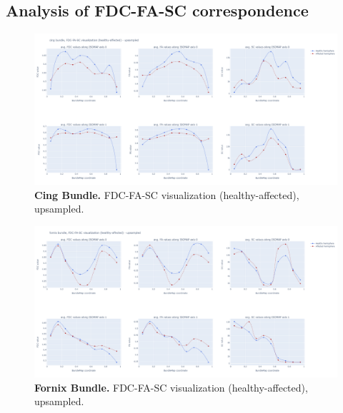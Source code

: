 \documentclass[thesis.tex]{subfiles}
\begin{document}
\subsection{Analysis of FDC-FA-SC correspondence}
\begin{figure}
    \centering
  \includegraphics[width=24cm]{thesis_radomskyi/images/cing bundle, FDC-FA-SC visualization (healthy-affected) - upsampled.png}
    \caption{\textbf{Cing Bundle.} FDC-FA-SC visualization (healthy-affected), upsampled.}
    \label{fig:cing-bundle-fdc-fa-sc}
\end{figure}

\begin{figure}
    \centering
  \includegraphics[width=24cm]{thesis_radomskyi/images/fornix bundle, FDC-FA-SC visualization (healthy-affected) - upsampled.png}
    \caption{\textbf{Fornix Bundle.} FDC-FA-SC visualization (healthy-affected), upsampled.}
    \label{fig:fornix-bundle-fdc-fa-sc}
\end{figure}
\end{document}
